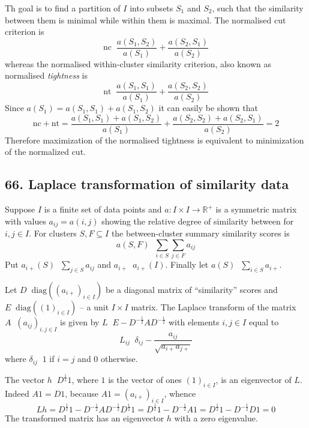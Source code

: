\documentclass[a4paper]{article}
\newcommand{\brac}[1]{{\left ( #1 \right )}}
\newcommand{\Real}{\mathbb{R}}
\newcommand{\defn}{\mathop{\overset{\Delta}{=}}\nolimits}
\begin{document}
Th goal is to find a partition of $I$ into subsets $S_1$ and $S_2$, such that the similarity between them is minimal while within them is maximal. The normalised cut criterion is \[\text{nc}\defn \frac{a(S_1,S_2)}{a(S_1)} + \frac{a(S_2,S_1)}{a(S_2)}\] whereas the normalised within-cluster similarity criterion, also known as normalised \emph{tightness} is \[\text{nt}\defn \frac{a(S_1,S_1)}{a(S_1)} + \frac{a(S_2,S_2)}{a(S_2)}\] Since $a(S_1) = a(S_1,S_1) + a(S_1,S_2)$ it can easily be shown that \[\text{nc} + \text{nt} = \frac{a(S_1,S_1) + a(S_1,S_2)}{a(S_1)} + \frac{a(S_2,S_2) + a(S_2,S_1)}{a(S_2)} = 2\] Therefore maximization of the normalised tightness is equivalent to minimization of the normalized cut.


\subsection*{66. Laplace transformation of similarity data} %
\label{sub:question_66}
Suppose $I$ is a finite set of data points and $a:I\times I \to \Real^+$ is a symmetric matrix with values $a_{ij} = a(i,j)$ showing the relative degree of similarity between for $i,j\in I$. For clusters $S,F\subseteq I$ the between-cluster summary similarity scores is \[a(S,F)\defn \sum_{i\in S}\sum_{j\in F} a_{ij}\] Put $a_{i+}(S)\defn \sum_{j\in S} a_{ij}$ and $a_{i+} \defn a_{i+}(I)$. Finally let $a(S) \defn \sum_{i\in S} a_{i+}$.

Let $D\defn \text{diag}\brac{\brac{a_{i+}}_{i\in I}}$ be a diagonal matrix of ``similarity'' scores and $E\defn \text{diag}\brac{\brac{1}_{i\in I}}$ -- a unit $I\times I$ matrix. The Laplace transform of the matrix $A\defn \brac{a_{ij}}_{i,j\in I}$ is given by $L \defn E - D^{-\frac{1}{2}} A D^{-\frac{1}{2}}$ with elements $i,j\in I$ equal to \[L_{ij} \defn \delta_{ij} - \frac{a_{ij}}{\sqrt{ a_{i+} a_{j+} }}\] where $\delta_{ij}\defn 1$ if $i=j$ and $0$ otherwise.

The vector $h \defn D^{\frac{1}{2}} 1$, where $1$ is the vector of ones $\brac{1}_{i\in I}$, is an eigenvector of $L$. Indeed $A 1 = D 1$, because $A 1 = \brac{a_{i+}}_{i\in I}$, whence \[L h = D^\frac{1}{2} 1 - D^{-\frac{1}{2}} A D^{-\frac{1}{2}}D^\frac{1}{2} 1 = D^\frac{1}{2} 1 - D^{-\frac{1}{2}} A 1 = D^\frac{1}{2} 1 - D^{-\frac{1}{2}} D 1 = 0\] The transformed matrix has an eigenvector $h$ with a zero eigenvalue.
\end{document}
